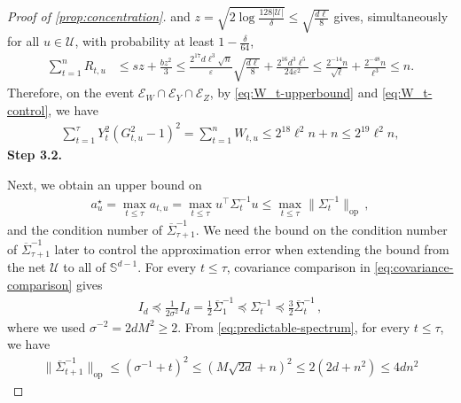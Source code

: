 \documentclass[11pt]{article}
\newcommand{\proofstepinline}[1]{%
    {\sffamily\bfseries\color{blue!55!black}Step #1.}\enspace
}
\newcommand{\op}{\mathrm{op}}
\newcommand{\1}{\mathbf 1}
\newcommand{\eps}{\varepsilon}
\begin{document}
\begin{proof}[Proof of \cref{prop:concentration}]
    and $z = \sqrt{2 \log\frac{128|\mathcal{U}|}{\delta}}\leq \sqrt{\frac{d\ell}{8}}$ gives, simultaneously for all $u\in\mathcal U$, with
    probability at least $1-\frac{\delta}{64}$,
    \begin{align}
        \sum_{t=1}^nR_{t,u}
         & \leq
        sz+\frac{bz^2}{3}
        \leq
        \frac{2^{17}d\ell^3\sqrt n}{\eps}
        \sqrt{\frac{d\ell}{8}}
        +
        \frac{2^{16}d^3\ell^5}{24\eps^2}
        \leq
        \frac{2^{-14}n}{\sqrt\ell}
        +
        \frac{2^{-48}n}{\ell^3}
        \leq
        n.
    \end{align}
    Therefore, on the event $\mathcal E_W\cap\mathcal E_Y\cap\mathcal E_Z$, by \eqref{eq:W_t-upperbound} and \eqref{eq:W_t-control}, we have
    \begin{align}
        \sum_{t=1}^{\tau}
        Y_t^2(G_{t,u}^2-1)^2
        =
        \sum_{t=1}^n
        W_{t,u}
        \leq
        2^{18}\ell^2n
        +n
        \leq
        2^{19}\ell^2n,
        \label{eq:H-realised-score-energy}
    \end{align}
    \proofstepinline{3.2}
    Next, we obtain an upper bound on
    \begin{align}
        a_u^\star
        =
        \max_{t\leq\tau} a_{t,u}
        =
        \max_{t\leq\tau} u^\top\Sigma_t^{-1}u
        \leq
        \max_{t\leq\tau} \|\Sigma_t^{-1}\|_{\op}\,,
    \end{align}
    and the condition number of $\overline\Sigma_{\tau+1}^{-1}$.
    We need the bound on the condition number of $\overline\Sigma_{\tau+1}^{-1}$ later to control the approximation error when extending the bound from the net $\mathcal U$ to all of $\mathbb S^{d-1}$.
    For every $t\leq\tau$, covariance comparison in \eqref{eq:covariance-comparison} gives
    \begin{align}
        I_d
        \preceq
        \frac{1}{2\sigma^2}I_d
        =
        \frac{1}{2} \overline\Sigma_1^{-1}
        \preceq
        \Sigma_t^{-1}
        \preceq
        \frac32\overline\Sigma_t^{-1}\,,
        \label{eq:roundwise-spectral-range}
    \end{align}
    where we used $\sigma^{-2}=2dM^2\geq2$.
    From \eqref{eq:predictable-spectrum}, for every $t\leq\tau$, we have
    \begin{align}
        \|\overline\Sigma_{t+1}^{-1}\|_{\op}
        \leq
        \left(
        \sigma^{-1} + t
        \right)^2
        \leq
        \left(
        M\sqrt{2d} + n
        \right)^2
        \leq
        2(2d+n^2)
        \leq
        4dn^2

\end{align}
\end{proof}
\end{document}
